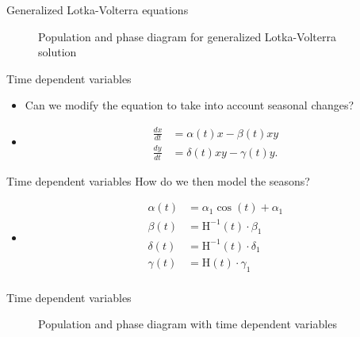 \documentclass{beamer}
\begin{document}
\begin{frame}{Generalized Lotka-Volterra equations}
	\begin{figure}
		\centering

		\qquad
	
		\caption{Population and phase diagram for generalized Lotka-Volterra solution}
	\end{figure}

\end{frame}

\begin{frame}{Time dependent variables}
	\begin{itemize}
		\item<1-> Can we modify the equation to take into account seasonal changes?
		\item<2->\begin{align}
		    \frac{dx}{dt} &= \alpha(t) x - \beta(t) xy \nonumber\\
		    \frac{dy}{dt} &= \delta(t) xy - \gamma(t) y.\label{eq: lv time dependent}
		\end{align}
	\end{itemize}
\end{frame}

\begin{frame}{Time dependent variables}
	How do we then model the seasons?
	\begin{itemize}
		\item<2->\begin{align*}
		    \alpha(t) &= \alpha_1\cos(t)+ \alpha_1\\
		    \beta(t) &=  \text{H}^{-1}(t)\cdot \beta_1\\
		    \delta(t) &= \text{H}^{-1}(t)\cdot \delta_1\\
		    \gamma(t) &= \text{H}(t)\cdot \gamma_1\\
		\end{align*}
	\end{itemize}
\end{frame}

\begin{frame}{Time dependent variables}
	\begin{figure}
		\centering

		\qquad
	
		\caption{Population and phase diagram with time dependent variables}
		\label{fig: time dependent}
	\end{figure}

\end{frame}
\end{document}
